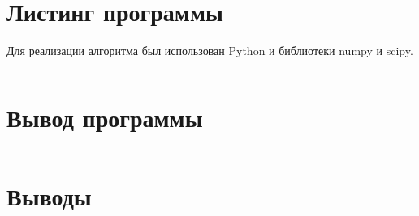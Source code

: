 \documentclass[14pt, a4paper]{article}
\begin{document}
  \section{Листинг программы}
  Для реализации алгоритма был использован Python и библиотеки numpy и scipy.

\begin{lstlisting}

\end{lstlisting}

  \section{Вывод программы}
\begin{verbatim}
\end{verbatim}

  \section{Выводы}
\end{document}
